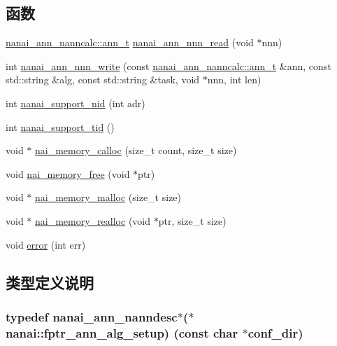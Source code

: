 \subsection*{函数}
\begin{DoxyCompactItemize}
\item 
\hyperlink{classnanai_1_1nanai__ann__nanncalc_1_1ann__t}{nanai\+\_\+ann\+\_\+nanncalc\+::ann\+\_\+t} \hyperlink{namespacenanai_a2110c709a5eb7407e8f0c6f3b8d019fb}{nanai\+\_\+ann\+\_\+nnn\+\_\+read} (void $\ast$nnn)
\item 
int \hyperlink{namespacenanai_a0ed58a3fd976881313c718c85f77a168}{nanai\+\_\+ann\+\_\+nnn\+\_\+write} (const \hyperlink{classnanai_1_1nanai__ann__nanncalc_1_1ann__t}{nanai\+\_\+ann\+\_\+nanncalc\+::ann\+\_\+t} \&ann, const std\+::string \&alg, const std\+::string \&task, void $\ast$nnn, int len)
\item 
int \hyperlink{namespacenanai_a8955229cdf11e2d23ab55fc290c48149}{nanai\+\_\+support\+\_\+nid} (int adr)
\item 
int \hyperlink{namespacenanai_a8580e60e0a68dee6dcbc37c87bb96c64}{nanai\+\_\+support\+\_\+tid} ()
\item 
void $\ast$ \hyperlink{namespacenanai_a6b14a6c7614acd05e543b753f956f014}{nai\+\_\+memory\+\_\+calloc} (size\+\_\+t count, size\+\_\+t size)
\item 
void \hyperlink{namespacenanai_a5a7f4b23abf51a72b48e4b9b1a6bc1ab}{nai\+\_\+memory\+\_\+free} (void $\ast$ptr)
\item 
void $\ast$ \hyperlink{namespacenanai_af06ac34e8be6b06f6187e1339406a93d}{nai\+\_\+memory\+\_\+malloc} (size\+\_\+t size)
\item 
void $\ast$ \hyperlink{namespacenanai_ac8b2a5d411cf6fdafc7483649501d4eb}{nai\+\_\+memory\+\_\+realloc} (void $\ast$ptr, size\+\_\+t size)
\item 
void \hyperlink{namespacenanai_a89261d96bcefbd9b2e87c85a4370f878}{error} (int err)
\end{DoxyCompactItemize}


\subsection{类型定义说明}
\hypertarget{namespacenanai_af358544d3d83ecb56361b1eaa46a0e98}{}
\subsubsection[{fptr\+\_\+ann\+\_\+alg\+\_\+setup}]{\setlength{\rightskip}{0pt plus 5cm}typedef {\bf nanai\+\_\+ann\+\_\+nanndesc}$\ast$($\ast$ nanai\+::fptr\+\_\+ann\+\_\+alg\+\_\+setup) (const char $\ast$conf\+\_\+dir)}\label{namespacenanai_af358544d3d83ecb56361b1eaa46a0e98}


